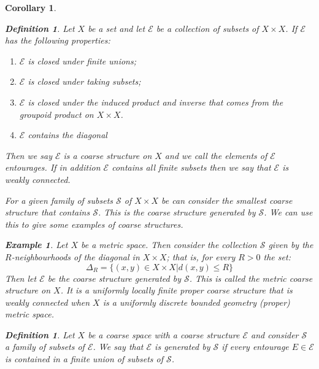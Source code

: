 \documentclass[11pt]{amsart}
\theoremstyle{plain}
\newtheorem{corollary}[theorem]{Corollary}%
\theoremstyle{definition}%
\newtheorem{definition}[theorem]{Definition}%
\newtheorem{example}[theorem]{Example}%
\theoremstyle{remark}%
\begin{document}
\begin{corollary}
\begin{definition}
Let $X$ be a set and let $\mathcal{E}$ be a collection of subsets of $X \times X$. If $\mathcal{E}$ has the following properties:
\begin{enumerate}
\item $\mathcal{E}$ is closed under finite unions;
\item $\mathcal{E}$ is closed under taking subsets;
\item $\mathcal{E}$ is closed under the induced product and inverse that comes from the groupoid product on $X \times X$.
\item $\mathcal{E}$ contains the diagonal
\end{enumerate}
Then we say $\mathcal{E}$ is a \textit{coarse structure} on $X$ and we call the elements of $\mathcal{E}$ \textit{entourages}. If in addition $\mathcal{E}$ contains all finite subsets then we say that $\mathcal{E}$ is \textit{weakly connected}.
\end{definition}

For a given family of subsets $\mathcal{S}$ of $X \times X$ be can consider the smallest coarse structure that contains $\mathcal{S}$. This is the coarse structure generated by $\mathcal{S}$. We can use this to give some examples of coarse structures.

\begin{example}\label{ex:MCS}
Let $X$ be a metric space. Then consider the collection $\mathcal{S}$ given by the $R$-neighbourhoods of the diagonal in $X\times X$; that is, for every $R>0$ the set:
\begin{equation*}
\Delta_{R}=\lbrace (x,y) \in X \times X | d(x,y)\leq R \rbrace
\end{equation*}
Then let $\mathcal{E}$ be the coarse structure generated by $\mathcal{S}$. This is called the \textit{metric coarse structure} on $X$. It is a uniformly locally finite proper coarse structure that is weakly connected when $X$ is a uniformly discrete bounded geometry (proper) metric space.
\end{example}

\begin{definition}
Let $X$ be a coarse space with a coarse structure $\mathcal{E}$ and consider $\mathcal{S}$ a family of subsets of $\mathcal{E}$. We say that $\mathcal{E}$ is generated by $\mathcal{S}$ if every entourage $E \in \mathcal{E}$ is contained in a finite union of subsets of $\mathcal{S}$.
\end{definition}


\end{corollary}
\end{document}
